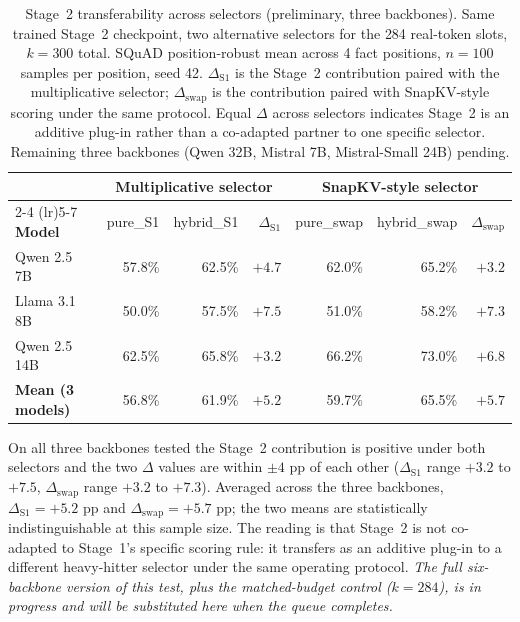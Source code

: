 \begin{table}[t]
\caption{Stage~2 transferability across selectors (preliminary, three backbones). Same trained Stage~2 checkpoint, two alternative selectors for the 284 real-token slots, $k{=}300$ total. SQuAD position-robust mean across 4 fact positions, $n{=}100$ samples per position, seed 42. $\Delta_{\text{S1}}$ is the Stage~2 contribution paired with the multiplicative selector; $\Delta_{\text{swap}}$ is the contribution paired with SnapKV-style scoring under the same protocol. Equal $\Delta$ across selectors indicates Stage~2 is an additive plug-in rather than a co-adapted partner to one specific selector. Remaining three backbones (Qwen 32B, Mistral 7B, Mistral-Small 24B) pending.}
\label{tab:e3_transfer}
\centering
\small
\setlength{\tabcolsep}{5pt}
\begin{tabular}{l rrr@{\hskip 8pt} rrr}
\toprule
& \multicolumn{3}{c}{\textbf{Multiplicative selector}} & \multicolumn{3}{c}{\textbf{SnapKV-style selector}} \\
\cmidrule(lr){2-4} \cmidrule(lr){5-7}
\textbf{Model} & pure\_S1 & hybrid\_S1 & $\Delta_{\text{S1}}$ & pure\_swap & hybrid\_swap & $\Delta_{\text{swap}}$ \\
\midrule
Qwen 2.5 7B   & 57.8\% & 62.5\% & $+4.7$ & 62.0\% & 65.2\% & $+3.2$ \\
Llama 3.1 8B  & 50.0\% & 57.5\% & $+7.5$ & 51.0\% & 58.2\% & $+7.3$ \\
Qwen 2.5 14B  & 62.5\% & 65.8\% & $+3.2$ & 66.2\% & 73.0\% & $+6.8$ \\
\midrule
\textbf{Mean (3 models)} & 56.8\% & 61.9\% & $\boldsymbol{+5.2}$ & 59.7\% & 65.5\% & $\boldsymbol{+5.7}$ \\
\bottomrule
\end{tabular}
\end{table}

On all three backbones tested the Stage~2 contribution is positive under both selectors and the two $\Delta$ values are within $\pm 4$ pp of each other ($\Delta_{\text{S1}}$ range $+3.2$ to $+7.5$, $\Delta_{\text{swap}}$ range $+3.2$ to $+7.3$). Averaged across the three backbones, $\Delta_{\text{S1}} = +5.2$ pp and $\Delta_{\text{swap}} = +5.7$ pp; the two means are statistically indistinguishable at this sample size. The reading is that Stage~2 is not co-adapted to Stage~1's specific scoring rule: it transfers as an additive plug-in to a different heavy-hitter selector under the same operating protocol. \textit{The full six-backbone version of this test, plus the matched-budget control ($k{=}284$), is in progress and will be substituted here when the queue completes.}


